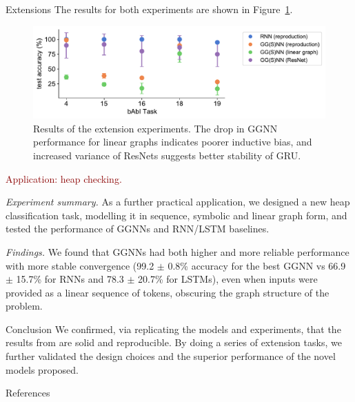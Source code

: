 \documentclass[final,hyperref={pdfpagelabels=false}]{beamer}
\begin{document}
\begin{frame}[t]
\begin{columns}[t]
\begin{column}{.3\textwidth}
\begin{block}{Extensions}
      \vspace{0.1in}
      The results for both experiments are shown in Figure~\ref{fig:extension}. 
      \vspace{0.2in}
      \begin{figure}
            \centering
              \includegraphics[width=\textwidth]{imgs/extension_plot.pdf}
            \caption{Results of the extension experiments. The drop in GGNN performance for linear graphs indicates poorer inductive bias, and increased variance of ResNets suggests better stability of GRU.}
            \label{fig:extension}
          \end{figure}

      \textcolor{darkred}{Application: heap checking.}

      \textit{Experiment summary.} As a further practical application, we designed a new heap classification task, modelling it in sequence, symbolic and linear graph form, and tested the performance of GGNNs and RNN/LSTM baselines.
      \vspace{0.2in}

      \textit{Findings.} We found that GGNNs had both higher and more reliable performance with more stable convergence (99.2 $\pm$ 0.8\% accuracy for the best GGNN vs 66.9 $\pm$ 15.7\% for RNNs and 78.3 $\pm$ 20.7\% for LSTMs), even when inputs were provided as a linear sequence of tokens, obscuring the graph structure of the problem.
    
    \end{block}
    \vspace{-0.6in}
    \begin{block}{Conclusion}
      We confirmed, via replicating the models and experiments, that the results from \cite{DBLP:journals/corr/LiTBZ15} are solid and reproducible. By doing a series of extension tasks, we further validated the design choices and the superior performance of the novel models proposed.
    \end{block}
    \vspace{-0.6in}
    \begin{block}{References}
      \linespread{0.928}
      \printbibliography
    \end{block}
    

\end{column}
\end{columns}
\end{frame}
\end{document}
